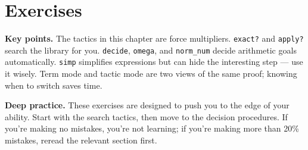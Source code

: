 \section{Exercises}\label{sec:13-working-efficiently:06-exercises:1}

\textbf{Key points.} The tactics in this chapter are force multipliers. \texttt{exact?} and \texttt{apply?} search the library for you. \texttt{decide}, \texttt{omega}, and \texttt{norm\_\allowbreak{}num} decide arithmetic goals automatically. \texttt{simp} simplifies expressions but can hide the interesting step --- use it wisely. Term mode and tactic mode are two views of the same proof; knowing when to switch saves time.

\textbf{Deep practice.} These exercises are designed to push you to the edge of your ability. Start with the search tactics, then move to the decision procedures. If you're making no mistakes, you're not learning; if you're making more than 20\% mistakes, reread the relevant section first.

